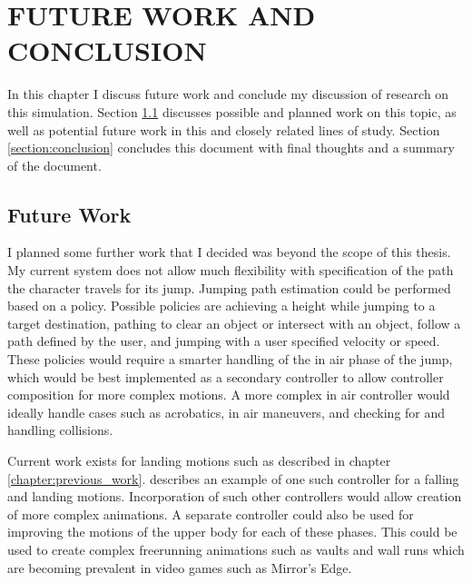 
 
\chapter{FUTURE WORK AND CONCLUSION}
\label{chapter:future_work}
In this chapter I discuss future work and conclude my discussion of research on this simulation.  Section \ref{section:future_work} discusses possible and planned work on this topic, as well as potential future work in this and closely related lines of study.  Section \ref{section:conclusion} concludes this document with final thoughts and a summary of the document.

\section{Future Work}
\label{section:future_work}

I planned some further work that I decided was beyond the scope of this thesis.  My current system does not allow much flexibility with specification of the path the character travels for its jump.  Jumping path estimation could be performed based on a policy.  Possible policies are achieving a height while jumping to a target destination, pathing to clear an object or intersect with an object, follow a path defined by the user, and jumping with a user specified velocity or speed.  These policies would require a smarter handling of the in air phase of the jump, which would be best implemented as a secondary controller to allow controller composition for more complex motions.  A more complex in air controller would ideally handle cases such as acrobatics, in air maneuvers, and checking for and handling collisions.

Current work exists for landing motions such as described in chapter \ref{chapter:previous_work}.   \liufall{} describes an example of one such controller for a falling and landing motions.  Incorporation of such other controllers would allow creation of more complex animations.  A separate controller could also be used for improving the motions of the upper body for each of these phases.  This could be used to create complex freerunning animations such as vaults and wall runs which are becoming prevalent in video games such as Mirror's Edge.

